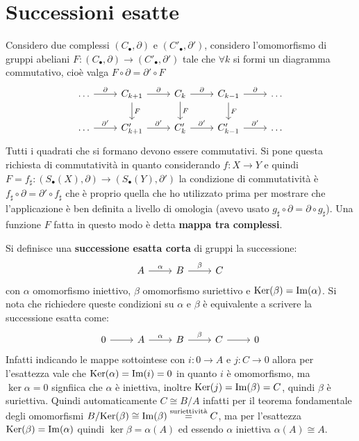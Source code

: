 \section{Successioni esatte}

Considero due complessi $ (C_\bullet, \partial) $ e $ (C'_\bullet, \partial') $, considero l'omomorfismo
di gruppi abeliani $ F \colon (C_\bullet, \partial) \to (C'_\bullet, \partial') $ tale che
$ \forall k $ si formi un diagramma commutativo, cioè valga $ F \circ \partial = \partial' \circ F $
\[
  \begin{tikzcd}
    \dots \arrow{r}{\partial} &  C_{k+1}  \arrow{r}{\partial} \arrow{d}{F} &  C_{k}  \arrow{r}{\partial} \arrow{d}{F} & C_{k-1}  \arrow{r}{\partial} \arrow{d}{F} & \dots \\
    \dots \arrow{r}{\partial'} &  C'_{k+1}  \arrow{r}{\partial'} &  C'_{k}  \arrow{r}{\partial'}  &  C'_{k-1} \arrow{r}{\partial'} & \dots
  \end{tikzcd}
\]
Tutti i quadrati che si formano devono essere
commutativi. Si pone questa richiesta di commutatività
in quanto considerando $ f \colon X \to Y $ e quindi
$ F = f_\sharp \colon (S_\bullet(X), \partial) \to  (S_\bullet(Y), \partial') $ la condizione
di commutatività è $ f_\sharp \circ \partial = \partial' \circ f_\sharp $ che è
proprio quella che ho utilizzato prima per mostrare
che l'applicazione è ben definita a livello
di omologia (avevo usato $ g_\sharp \circ \partial = \partial \circ g_\sharp $).
Una funzione $ F $ fatta in questo modo è detta
\textbf{mappa tra complessi}.

\begin{definition}
  Si definisce una \textbf{successione esatta corta} di
  gruppi la successione:
  \[
    \begin{tikzcd}
      A \arrow{r}{\alpha} & B \arrow{r}{\beta} & C
    \end{tikzcd}
  \]
  con $ \alpha $ omomorfismo iniettivo, $ \beta $ omomorfismo suriettivo e $ \mathrm{Ker}( \beta) = \mathrm{Im}( \alpha ) $.
  Si nota che richiedere queste condizioni su $ \alpha $ e $ \beta $ è equivalente a scrivere la
  successione esatta come:
  \[
    \begin{tikzcd}
      0 \arrow{r}{} & A \arrow{r}{\alpha} & B\arrow{r}{\beta} & C \arrow{r}{} & 0
    \end{tikzcd}
  \]
  Infatti indicando le mappe sottointese con $ i \colon 0 \to A $ e $ j \colon C \to 0 $
  allora per l'esattezza vale che $ \mathrm{Ker}( \alpha) = \mathrm{Im}( i ) = 0 $ in quanto $ i $ è
  omomorfismo, ma $ \ker{\alpha} = 0 $ signfiica che $ \alpha $ è iniettiva, inoltre
  $ \mathrm{Ker}( j) = \mathrm{Im}( \beta ) = C $, quindi $ \beta $ è suriettiva. Quindi automaticamente
  $ C \cong {B} \slash {A} $ infatti per il teorema fondamentale degli omomorfismi
  $ {B} \slash {\mathrm{Ker}( \beta)} \cong \mathrm{Im}( \beta ) \overset{\text{suriettività}}{=} C $, ma per
  l'esattezza $ \mathrm{Ker}( \beta) = \mathrm{Im}( \alpha ) $ quindi $ \ker{\beta} = \alpha(A) $ ed essendo $ \alpha $
  iniettiva $ \alpha(A) \cong A $.
\end{definition}

